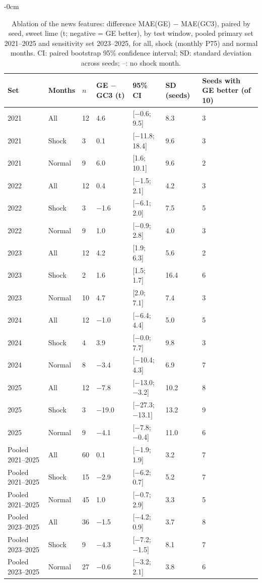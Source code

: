 \begin{table}[H]
\centering
\footnotesize
\setlength{\tabcolsep}{4pt}
\caption{Ablation of the news features: difference MAE(GE) $-$ MAE(GC3), paired by seed, sweet lime (t; negative = GE better), by test window, pooled primary set 2021--2025 and sensitivity set 2023--2025, for all, shock (monthly P75) and normal months. CI: paired bootstrap 95\% confidence interval; SD: standard deviation across seeds; --: no shock month.}
\label{tab:T11_ablacion_dulce}
\begin{adjustwidth}{-\extralength}{0cm}
\centering
\begin{tabular}{lllllll}
\toprule
Set & Months & $n$ & GE $-$ GC3 (t) & 95\% CI & SD (seeds) & Seeds with GE better (of 10) \\
\midrule
2021 & All & 12 & 4.6 & [$-$0.6; 9.5] & 8.3 & 3 \\
2021 & Shock & 3 & 0.1 & [$-$11.8; 18.4] & 9.6 & 3 \\
2021 & Normal & 9 & 6.0 & [1.6; 10.1] & 9.6 & 2 \\
2022 & All & 12 & 0.4 & [$-$1.5; 2.1] & 4.2 & 3 \\
2022 & Shock & 3 & $-$1.6 & [$-$6.1; 2.0] & 7.5 & 5 \\
2022 & Normal & 9 & 1.0 & [$-$0.9; 2.8] & 4.0 & 3 \\
2023 & All & 12 & 4.2 & [1.9; 6.3] & 5.6 & 2 \\
2023 & Shock & 2 & 1.6 & [1.5; 1.7] & 16.4 & 6 \\
2023 & Normal & 10 & 4.7 & [2.0; 7.1] & 7.4 & 3 \\
2024 & All & 12 & $-$1.0 & [$-$6.4; 4.4] & 5.0 & 5 \\
2024 & Shock & 4 & 3.9 & [$-$0.0; 7.7] & 9.8 & 3 \\
2024 & Normal & 8 & $-$3.4 & [$-$10.4; 4.3] & 6.9 & 7 \\
2025 & All & 12 & $-$7.8 & [$-$13.0; $-$3.2] & 10.2 & 8 \\
2025 & Shock & 3 & $-$19.0 & [$-$27.3; $-$13.1] & 13.2 & 9 \\
2025 & Normal & 9 & $-$4.1 & [$-$7.8; $-$0.4] & 11.0 & 6 \\
Pooled 2021--2025 & All & 60 & 0.1 & [$-$1.9; 1.9] & 3.2 & 7 \\
Pooled 2021--2025 & Shock & 15 & $-$2.9 & [$-$6.2; 0.7] & 5.2 & 7 \\
Pooled 2021--2025 & Normal & 45 & 1.0 & [$-$0.7; 2.9] & 3.3 & 5 \\
Pooled 2023--2025 & All & 36 & $-$1.5 & [$-$4.2; 0.9] & 3.7 & 8 \\
Pooled 2023--2025 & Shock & 9 & $-$4.3 & [$-$7.2; $-$1.5] & 8.1 & 7 \\
Pooled 2023--2025 & Normal & 27 & $-$0.6 & [$-$3.2; 2.1] & 3.8 & 6 \\
\bottomrule
\end{tabular}
\end{adjustwidth}
\end{table}

